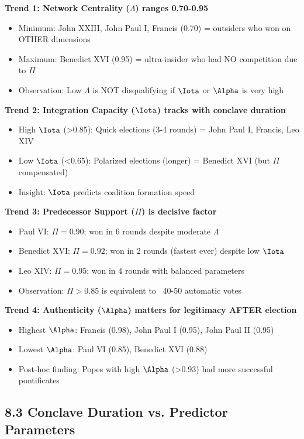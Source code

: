 \documentclass[11pt]{article}
\begin{document}
\textbf{Trend 1: Network Centrality ($\Lambda$) ranges 0.70-0.95}
\begin{itemize}
\item Minimum: John XXIII, John Paul I, Francis (0.70) = outsiders who won on OTHER dimensions
\item Maximum: Benedict XVI (0.95) = ultra-insider who had NO competition due to $\Pi$
\item Observation: Low $\Lambda$ is NOT disqualifying if $\Iota$ or $\Alpha$ is very high
\end{itemize}

\textbf{Trend 2: Integration Capacity ($\Iota$) tracks with conclave duration}
\begin{itemize}
\item High $\Iota$ (>0.85): Quick elections (3-4 rounds) = John Paul I, Francis, Leo XIV
\item Low $\Iota$ (<0.65): Polarized elections (longer) = Benedict XVI (but $\Pi$ compensated)
\item Insight: $\Iota$ predicts coalition formation speed
\end{itemize}

\textbf{Trend 3: Predecessor Support ($\Pi$) is decisive factor}
\begin{itemize}
\item Paul VI: $\Pi=0.90$; won in 6 rounds despite moderate $\Lambda$
\item Benedict XVI: $\Pi=0.92$; won in 2 rounds (fastest ever) despite low $\Iota$
\item Leo XIV: $\Pi=0.95$; won in 4 rounds with balanced parameters
\item Observation: $\Pi > 0.85$ is equivalent to ~40-50 automatic votes
\end{itemize}

\textbf{Trend 4: Authenticity ($\Alpha$) matters for legitimacy AFTER election}
\begin{itemize}
\item Highest $\Alpha$: Francis (0.98), John Paul I (0.95), John Paul II (0.95)
\item Lowest $\Alpha$: Paul VI (0.85), Benedict XVI (0.88)
\item Post-hoc finding: Popes with high $\Alpha$ (>0.93) had more successful pontificates
\end{itemize}

\subsection{8.3 Conclave Duration vs. Predictor Parameters}
\end{document}

